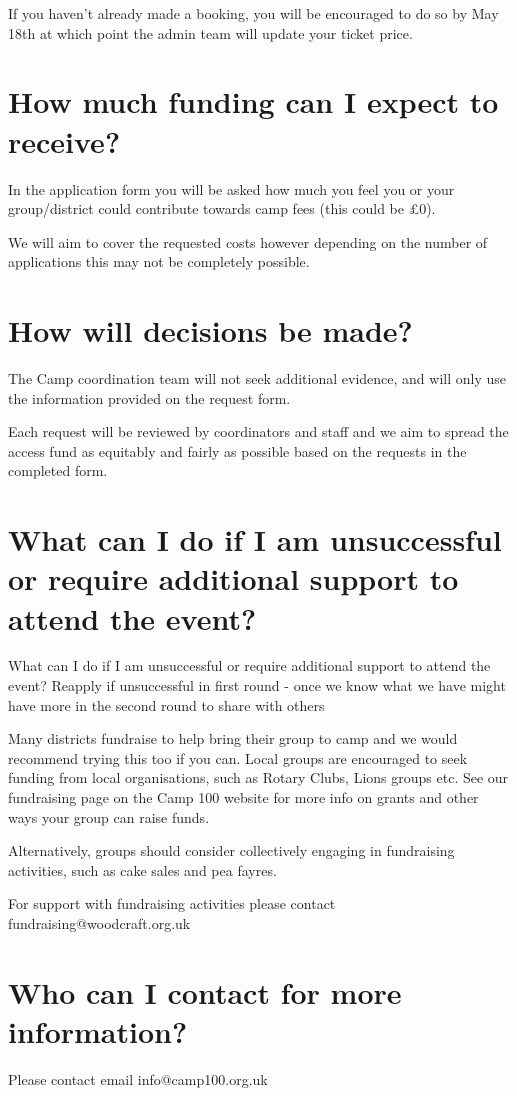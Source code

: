 \documentclass[a4paper, 11pt]{article}
\begin{document}
If you haven't already made a booking, you will be encouraged to do so by May 18th at which point the admin team will update your ticket price.

\section{How much funding can I expect to receive?}
In the application form you will be asked how much you feel you or your group/district could contribute towards camp fees (this could be £0). 

We will aim to cover the requested costs however depending on the number of applications this may not be completely possible.

\section{How will decisions be made?}
The Camp coordination team will not seek additional evidence, and will only use the information provided on the request form.

Each request will be reviewed by coordinators and staff and we aim to spread the access fund as equitably and fairly as possible based on the requests in the completed form. 

\section{What can I do if I am unsuccessful or require additional support to attend the event?}
What can I do if I am unsuccessful or require additional support to attend the event?
Reapply if unsuccessful in first round - once we know what we have might have more in the second round to share with others 

Many districts fundraise to help bring their group to camp and we would recommend trying this too if you can. Local groups are encouraged to seek funding from local organisations, such as Rotary Clubs, Lions groups etc. See our fundraising page on the Camp 100 website for more info on grants and other ways your group can raise funds.

Alternatively, groups should consider collectively engaging in fundraising activities, such as cake sales and pea fayres.

For support with fundraising activities please contact fundraising@woodcraft.org.uk 

\section{Who can I contact for more information?}
Please contact email info@camp100.org.uk 


\makedocumentbackpage
\end{document}
